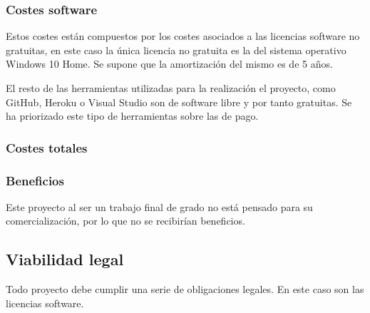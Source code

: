 \subsubsection{Costes software}
Estos costes están compuestos por los costes asociados a las licencias software no gratuitas, en este caso la única licencia no gratuita es la del sistema operativo Windows 10 Home. Se supone que la amortización del mismo es de 5 años.


El resto de las herramientas utilizadas para la realización el proyecto, como GitHub, Heroku o Visual Studio son de software libre y por tanto gratuitas. Se ha priorizado este tipo de herramientas sobre las de pago. 

\subsubsection{Costes totales}


\subsubsection{Beneficios}
Este proyecto al ser un trabajo final de grado no está pensado para su comercialización, por lo que no se recibirían beneficios.

\subsection{Viabilidad legal}
Todo proyecto debe cumplir una serie de obligaciones legales. En este caso son las licencias software.

